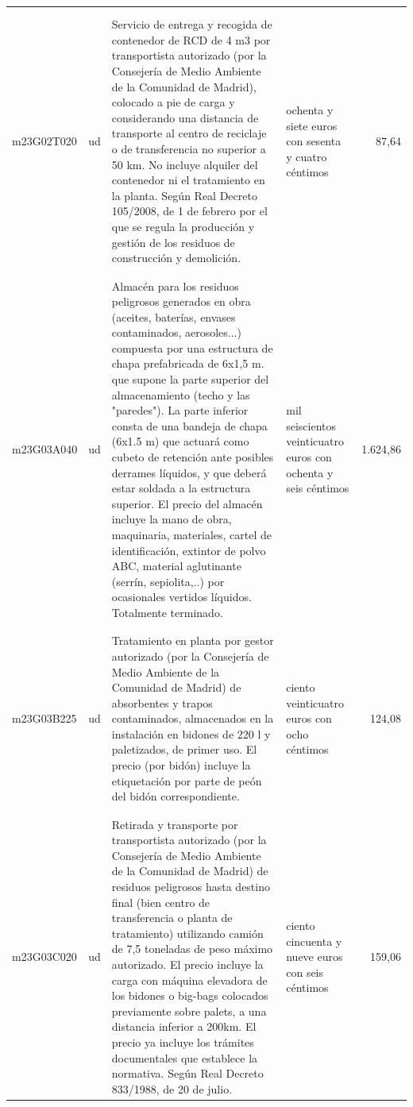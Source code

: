 \documentclass{book}%
\begin{document}
\begin{supertabular}{|l|l|p{5cm}|p{3cm}|r|}
&&&&\\%
&&&&\\%
m23G02T020&ud&Servicio de entrega y recogida de contenedor de RCD de 4 m3 por transportista autorizado (por la Consejería de Medio Ambiente de la Comunidad de Madrid), colocado a pie de carga y considerando una distancia de transporte al centro de reciclaje o de transferencia no superior a 50 km. No incluye alquiler del contenedor ni el tratamiento en la planta. Según Real Decreto 105/2008, de 1 de febrero por el que se regula la producción y gestión de los residuos de construcción y demolición.&ochenta y siete euros con sesenta y cuatro céntimos&87,64\\%
&&&&\\%
&&&&\\%
m23G03A040&ud&Almacén para los residuos peligrosos generados en obra (aceites, baterías, envases contaminados, aerosoles...) compuesta por una estructura de chapa prefabricada de 6x1,5 m. que supone la parte superior del almacenamiento (techo y las "paredes"). La parte inferior consta de una bandeja de chapa (6x1.5 m) que actuará como cubeto de retención ante posibles derrames líquidos, y que deberá estar soldada a la estructura superior. El precio del almacén incluye la mano de obra, maquinaria, materiales, cartel de identificación, extintor de polvo ABC, material aglutinante (serrín, sepiolita,..) por ocasionales vertidos líquidos. Totalmente terminado.&mil seiscientos veinticuatro euros con ochenta y seis céntimos&1.624,86\\%
&&&&\\%
&&&&\\%
m23G03B225&ud&Tratamiento en planta por gestor autorizado (por la Consejería de Medio Ambiente de la Comunidad de Madrid) de absorbentes y trapos contaminados, almacenados en la instalación en bidones de 220 l y paletizados, de primer uso. El precio (por bidón) incluye la etiquetación por parte de peón del bidón correspondiente.&ciento veinticuatro euros con ocho céntimos&124,08\\%
&&&&\\%
&&&&\\%
m23G03C020&ud&Retirada y transporte por transportista autorizado (por la Consejería de Medio Ambiente de la Comunidad de Madrid) de residuos peligrosos hasta destino final (bien centro de transferencia o planta de tratamiento) utilizando camión de 7,5 toneladas de peso máximo autorizado. El precio incluye la carga con máquina elevadora de los bidones o big{-}bags colocados previamente sobre palets, a una distancia inferior a 200km. El precio ya incluye los trámites documentales que establece la normativa. Según Real Decreto 833/1988, de 20 de julio.&ciento cincuenta y nueve euros con seis céntimos&159,06\\%

\end{supertabular}
\end{document}
